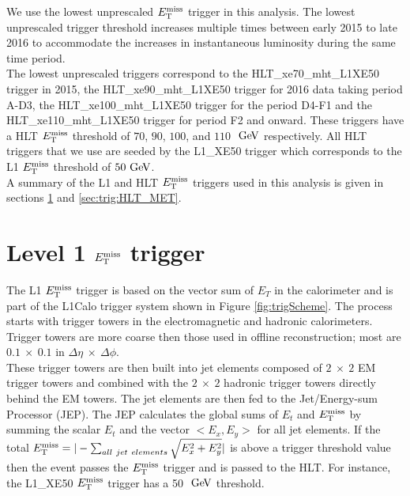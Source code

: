 \indent We use the lowest unprescaled $E_{\mathrm{T}}^{\mathrm{miss}}$ trigger in this analysis.  The lowest unprescaled trigger threshold increases multiple times between early 2015 to late 2016 to accommodate the increases in instantaneous luminosity during the same time period. \\

\indent The lowest unprescaled triggers correspond to the {\sc HLT\_xe70\_mht\_L1XE50} trigger in 2015,  the {\sc HLT\_xe90\_mht\_L1XE50} trigger for 2016 data taking period A-D3, the {\sc HLT\_xe100\_mht\_L1XE50} trigger for the period D4-F1 and the {\sc HLT\_xe110\_mht\_L1XE50} trigger for period F2 and onward. These triggers have a HLT $E_{\mathrm{T}}^{\mathrm{miss}}$ threshold of $70$, $90$, $100$, and $110$ $\gev$ respectively.   All HLT triggers that we use are seeded by the L1\_XE50 trigger which corresponds to  the L1 $E_{\mathrm{T}}^{\mathrm{miss}}$ threshold of $50 \gev$.   \\

\indent A summary of the L1 and HLT $E_{\mathrm{T}}^{\mathrm{miss}}$ triggers used in this analysis is given in sections \ref{sec:trig:L1Calo} and \ref{sec:trig:HLT_MET}.\\

\section{Level 1 $E_{\mathrm{T}}^{\mathrm{miss}}$ trigger}
\label{sec:trig:L1Calo}

\indent The L1 $E_{\mathrm{T}}^{\mathrm{miss}}$ trigger is based on the vector sum of $E_T$ in the calorimeter and is part of the L1Calo trigger system \cite{L1Calo} shown in Figure \ref{fig:trigScheme}.  The process starts with trigger towers in the electromagnetic and hadronic calorimeters.  Trigger towers are more coarse then those used in offline reconstruction; most are $0.1~\times~0.1$ in $\Delta\eta~\times~\Delta\phi$. \\%

\indent These trigger towers are then built into jet elements composed of $2~\times~2$ EM trigger towers and combined with the $2~\times~2$ hadronic trigger towers directly behind the EM towers. The jet elements are then fed to the Jet/Energy-sum Processor (JEP).  The JEP calculates the global sums of $E_t$ and $E_{\mathrm{T}}^{\mathrm{miss}}$ by summing the scalar $E_t$ and the vector $<E_x, E_y>$ for all jet elements.  If the total $E_{\mathrm{T}}^{\mathrm{miss}} = |- \sum_{all~jet~elements} \sqrt{E_x^2+E_y^2}|$ is above a trigger threshold value then the event passes the $E_{\mathrm{T}}^{\mathrm{miss}}$ trigger and is passed to the HLT.  For instance, the L1\_XE50 $E_{\mathrm{T}}^{\mathrm{miss}}$ trigger has a 50 $\gev$ threshold. \\


